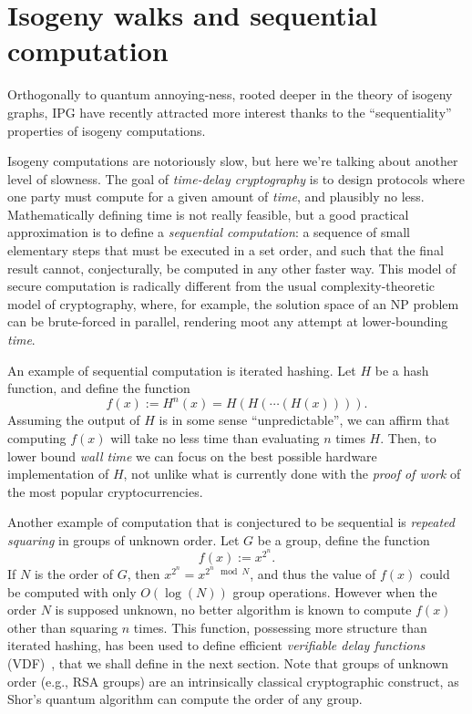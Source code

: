 \documentclass{article}
\begin{document}
\section{Isogeny walks and sequential computation}

Orthogonally to quantum annoying-ness, rooted deeper in the theory of
isogeny graphs, IPG have recently attracted more interest thanks to
the ``sequentiality'' properties of isogeny computations.

Isogeny computations are notoriously slow, but here we're talking
about another level of slowness.  The goal of \emph{time-delay
  cryptography} is to design protocols where one party must compute
for a given amount of \emph{time}, and plausibly no less.
Mathematically defining time is not really feasible, but a good
practical approximation is to define a \emph{sequential computation}:
a sequence of small elementary steps that must be executed in a set
order, and such that the final result cannot, conjecturally, be
computed in any other faster way.  This model of secure computation is
radically different from the usual complexity-theoretic model of
cryptography, where, for example, the solution space of an NP problem
can be brute-forced in parallel, rendering moot any attempt at
lower-bounding \emph{time}.

An example of sequential computation is iterated hashing. Let $H$ be a
hash function, and define the function
\[f(x) := H^n(x) = H(H(\cdots(H(x)))).\] Assuming the output of $H$ is
in some sense ``unpredictable'', we can affirm that computing $f(x)$
will take no less time than evaluating $n$ times $H$. Then, to lower
bound \emph{wall time} we can focus on the best possible hardware
implementation of $H$, not unlike what is currently done with the
\emph{proof of work} of the most popular cryptocurrencies.

Another example of computation that is conjectured to be sequential is
\emph{repeated squaring} in groups of unknown order.  Let $G$ be a
group, define the function
\[f(x) := x^{2^n}.\] If $N$ is the order of $G$, then
$x^{2^n} = x^{2^n \mod N}$, and thus the value of $f(x)$ could be
computed with only $O(\log(N))$ group operations.  However when the
order $N$ is supposed unknown, no better algorithm is known to compute
$f(x)$ other than squaring $n$ times.  This function, possessing more
structure than iterated hashing, has been used to define efficient
\emph{verifiable delay functions}
(VDF)~\cite{ITCS:Pietrzak19b,EC:Wesolowski19}, that we shall define in
the next section.  Note that groups of unknown order (e.g., RSA
groups) are an intrinsically classical cryptographic construct, as
Shor's quantum algorithm can compute the order of any group.
\end{document}
